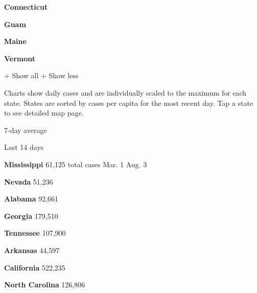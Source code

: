 \href{https://www.nytimes.com/interactive/2020/us/connecticut-coronavirus-cases.html}{}

\textbf{Connecticut}

\textbf{Guam}

\href{https://www.nytimes.com/interactive/2020/us/maine-coronavirus-cases.html}{}

\textbf{Maine}

\href{https://www.nytimes.com/interactive/2020/us/vermont-coronavirus-cases.html}{}

\textbf{Vermont}

+ Show all + Show less

Charts show daily cases and are individually scaled to the maximum for
each state. States are sorted by cases per capita for the most recent
day. Tap a state to see detailed map page.

\href{https://www.nytimes.com/interactive/2020/us/mississippi-coronavirus-cases.html}{}

7-day average

Last 14 days

\textbf{Mississippi} 61,125 total cases Mar. 1 Aug. 3

\href{https://www.nytimes.com/interactive/2020/us/nevada-coronavirus-cases.html}{}

\textbf{Nevada} 51,236

\href{https://www.nytimes.com/interactive/2020/us/alabama-coronavirus-cases.html}{}

\textbf{Alabama} 92,661

\href{https://www.nytimes.com/interactive/2020/us/georgia-coronavirus-cases.html}{}

\textbf{Georgia} 179,510

\href{https://www.nytimes.com/interactive/2020/us/tennessee-coronavirus-cases.html}{}

\textbf{Tennessee} 107,900

\href{https://www.nytimes.com/interactive/2020/us/arkansas-coronavirus-cases.html}{}

\textbf{Arkansas} 44,597

\href{https://www.nytimes.com/interactive/2020/us/california-coronavirus-cases.html}{}

\textbf{California} 522,235

\href{https://www.nytimes.com/interactive/2020/us/north-carolina-coronavirus-cases.html}{}

\textbf{North Carolina} 126,806

\href{https://www.nytimes.com/interactive/2020/us/wisconsin-coronavirus-cases.html}{}

